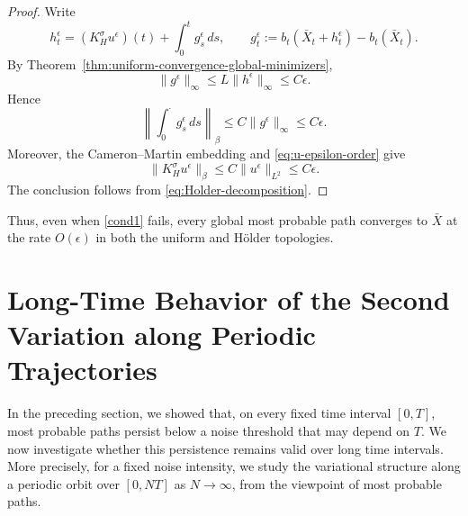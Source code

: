 \documentclass[preprint,12pt]{elsarticle}
\theoremstyle{definition}
\theoremstyle{plain}
\begin{document}
\begin{proof}
Write
\begin{equation}
\label{eq:Holder-decomposition}
    h^\epsilon_t
    =
    (K_H^\sigma u^\epsilon)(t)
    +
    \int_0^t g^\epsilon_s\,ds,
    \qquad
    g^\epsilon_t
    :=
    b_t(\bar X_t+h^\epsilon_t)-b_t(\bar X_t).
\end{equation}
By Theorem~\ref{thm:uniform-convergence-global-minimizers},
\begin{equation*}
    \|g^\epsilon\|_\infty
    \leq
    L\|h^\epsilon\|_\infty
    \leq
    C\epsilon.
\end{equation*}
Hence
\begin{equation*}
    \left\|
        \int_0^\cdot g^\epsilon_s\,ds
    \right\|_\beta
    \leq
    C\|g^\epsilon\|_\infty
    \leq
    C\epsilon.
\end{equation*}
Moreover, the Cameron--Martin embedding and
\eqref{eq:u-epsilon-order} give
\begin{equation*}
    \|K_H^\sigma u^\epsilon\|_\beta
    \leq
    C\|u^\epsilon\|_{L^2}
    \leq
    C\epsilon.
\end{equation*}
The conclusion follows from \eqref{eq:Holder-decomposition}.
\end{proof}

Thus, even when \eqref{cond1} fails, every global most probable path
converges to $\bar X$ at the rate $O(\epsilon)$ in both the uniform
and H\"older topologies. 


\section{Long-Time Behavior of the Second Variation along Periodic
Trajectories}
\label{sec:long-time-periodic-trajectories}

In the preceding section, we showed that, on every fixed time interval
$[0,T]$, most probable paths persist below a noise threshold that may
depend on $T$. We now investigate whether this persistence remains
valid over long time intervals. More precisely, for a fixed noise
intensity, we study the variational structure along a periodic orbit
over $[0,NT]$ as $N\to\infty$, from the viewpoint of most probable
paths.
\end{document}
